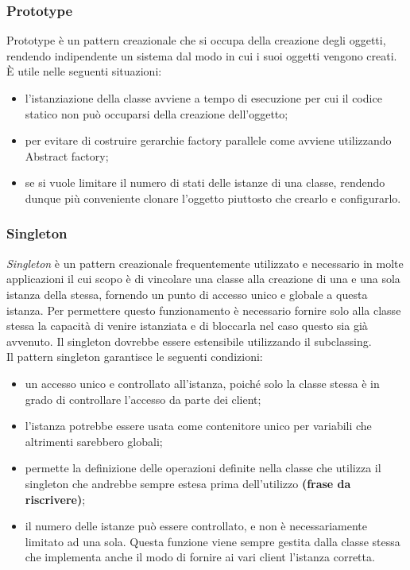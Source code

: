 \subsubsection{Prototype}
Prototype è un pattern creazionale che si occupa della creazione degli oggetti, rendendo indipendente un sistema dal modo in cui i suoi oggetti vengono creati.
È utile nelle seguenti situazioni:
\begin{itemize}
	\item l’istanziazione della classe avviene a tempo di esecuzione per cui il codice statico non può occuparsi della creazione dell’oggetto;
	\item per evitare di costruire gerarchie factory parallele come avviene utilizzando Abstract factory;
	\item se si vuole limitare il numero di stati delle istanze di una classe, rendendo dunque più conveniente clonare l’oggetto piuttosto che crearlo e configurarlo.
\end{itemize}

\subsubsection{Singleton}
\textit{Singleton} è un pattern creazionale frequentemente utilizzato e necessario in molte applicazioni il cui scopo è di vincolare una classe alla creazione di una e una sola istanza della stessa, fornendo un punto di accesso unico e globale a questa istanza. Per permettere questo funzionamento è necessario fornire solo alla classe stessa la capacità di venire istanziata e di bloccarla nel caso questo sia già avvenuto. Il singleton dovrebbe essere estensibile utilizzando il subclassing.\\
Il pattern singleton garantisce le seguenti condizioni:
\begin{itemize}
	\item un accesso unico e controllato all’istanza, poiché solo la classe stessa è in grado di controllare l’accesso da parte dei client;
	\item l’istanza potrebbe essere usata come contenitore unico per variabili che altrimenti sarebbero globali;
	\item permette la definizione delle operazioni definite nella classe che utilizza il singleton che andrebbe sempre estesa prima dell’utilizzo \textbf{(frase da riscrivere)};
	\item il numero delle istanze può essere controllato, e non è necessariamente limitato ad una sola. Questa funzione viene sempre gestita dalla classe stessa che implementa anche il modo di fornire ai vari client l’istanza corretta.
\end{itemize}

